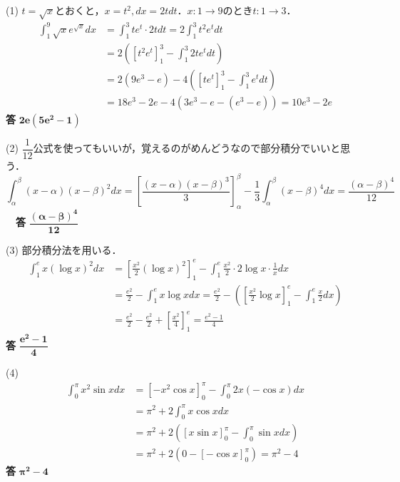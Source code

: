 \documentclass[a4paper,11pt]{ltjsarticle}
\begin{document}
\begin{toi}
(1) $t=\sqrt{x}$とおくと，$x=t^2, dx=2tdt$．$x:1\to9$のとき$t:1\to3$．
\[
\begin{aligned}
\int_1^9 \sqrt{x}e^{\sqrt{x}}dx &= \int_1^3 t e^t \cdot 2t dt = 2\int_1^3 t^2 e^t dt \\
&= 2\left( [t^2 e^t]_1^3 - \int_1^3 2t e^t dt \right) \\
&= 2(9e^3 - e) - 4( [te^t]_1^3 - \int_1^3 e^t dt ) \\
&= 18e^3 - 2e - 4(3e^3 - e - (e^3 - e)) = 10e^3 - 2e
\end{aligned}
\]
\hfill \textbf{答} \quad $\boldsymbol{2e(5e^2-1)}$

\vspace{0.5em}

(2) $\dfrac{1}{12}$公式を使ってもいいが，覚えるのがめんどうなので部分積分でいいと思う．
\[
\int_\alpha^\beta (x-\alpha)(x-\beta)^2dx = \left[\frac{(x-\alpha)(x-\beta)^3}3\right]_\alpha^\beta-\frac13\int_\alpha^\beta(x-\beta)^4dx=\frac{(\alpha-\beta)^4}{12} \]
 　\hfill\textbf{答} \quad $\boldsymbol{\dfrac{(\alpha-\beta)^4}{12}}$

\vspace{0.5em}

(3) 部分積分法を用いる．
\[
\begin{aligned}
\int_1^e x(\log x)^2dx &= \left[\frac{x^2}{2}(\log x)^2\right]_1^e - \int_1^e \frac{x^2}{2} \cdot 2\log x \cdot \frac{1}{x} dx \\
&= \frac{e^2}{2} - \int_1^e x\log x dx = \frac{e^2}{2} - \left( \left[\frac{x^2}{2}\log x\right]_1^e - \int_1^e \frac{x}{2}dx \right) \\
&= \frac{e^2}{2} - \frac{e^2}{2} + \left[\frac{x^2}{4}\right]_1^e = \frac{e^2-1}{4}
\end{aligned}
\]
\hfill \textbf{答} \quad $\boldsymbol{\dfrac{e^2-1}{4}}$

\vspace{0.5em}

(4) 
\[
\begin{aligned}
\int_0^\pi x^2\sin x dx &= [-x^2\cos x]_0^\pi - \int_0^\pi 2x(-\cos x)dx \\
&= \pi^2 + 2\int_0^\pi x\cos x dx \\
&= \pi^2 + 2\left( [x\sin x]_0^\pi - \int_0^\pi \sin x dx \right) \\
&= \pi^2 + 2(0 - [-\cos x]_0^\pi) = \pi^2 - 4
\end{aligned}
\]
\hfill \textbf{答} \quad $\boldsymbol{\pi^2-4}$
\end{toi}
\end{document}
